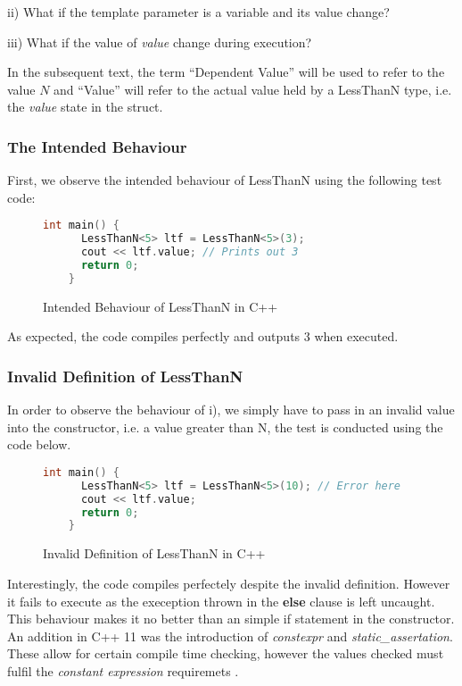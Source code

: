 \documentclass[a4paper,12pt]{report}
\begin{document}
ii) What if the template parameter is a variable and its 
value change? 

iii) What if the value of \textit{value} change during execution?

In the subsequent text, the term ``Dependent Value'' will be used to refer to the 
value $N$ and ``Value'' will refer to the actual value held by a LessThanN type, 
i.e. the \textit{value} state in the struct. 

\subsubsection{The Intended Behaviour}
First, we observe the intended behaviour of LessThanN using the following test 
code:
\begin{figure}[H]
  \begin{lstlisting}[language=c++]     
    int main() {
      LessThanN<5> ltf = LessThanN<5>(3);
      cout << ltf.value; // Prints out 3
      return 0;
    }
  \end{lstlisting}
  \caption{Intended Behaviour of LessThanN in C++}
\end{figure}

\par
As expected, the code compiles perfectly and outputs 3 when executed.

\subsubsection{Invalid Definition of LessThanN}
In order to observe the behaviour of i), we simply have to pass in an 
invalid value into the constructor, i.e. a value greater than N, 
the test is conducted using the code below. 

\begin{figure}[H]
  \begin{lstlisting}[language=c++]     
    int main() {
      LessThanN<5> ltf = LessThanN<5>(10); // Error here
      cout << ltf.value; 
      return 0;
    }
  \end{lstlisting}
  \caption{Invalid Definition of LessThanN in C++}
\end{figure}

\par
Interestingly, the code compiles perfectely despite the invalid definition. 
However it fails to execute as the exeception thrown in the \textbf{else} clause 
is left uncaught. This behaviour makes it no better than an simple if statement 
in the constructor. An addition in C++ 11 was the introduction of 
\textit{constexpr} and \textit{static\_assertation}. These allow for certain 
compile time checking, however the values checked must fulfil 
the \textit{constant expression} requiremets \cite{cppConstExpr}. 
\end{document}
